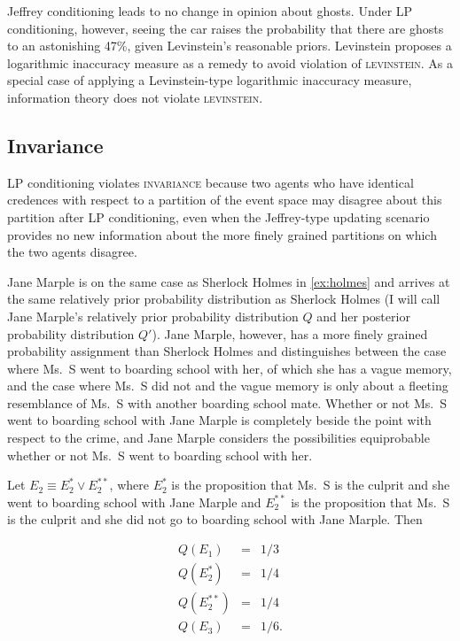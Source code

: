 \documentclass[smallextended]{svjour3}       %
\begin{document}
Jeffrey conditioning leads to no change in opinion about ghosts. Under
LP conditioning, however, seeing the car raises the probability that
there are ghosts to an astonishing 47\%, given Levinstein's reasonable
priors. Levinstein proposes a logarithmic inaccuracy measure as a
remedy to avoid violation of \textsc{levinstein}. As a special case of
applying a Levinstein-type logarithmic inaccuracy measure, information
theory does not violate \textsc{levinstein}.

\subsection{Invariance}
\label{Invariance}

LP conditioning violates \textsc{invariance} because two agents who
have identical credences with respect to a partition of the event
space may disagree about this partition after LP conditioning, even
when the Jeffrey-type updating scenario provides no new information
about the more finely grained partitions on which the two agents
disagree. 

\begin{quotex}
  \label{ex:marple} Jane Marple is on the same
  case as Sherlock Holmes in {\xample} \ref{ex:holmes} and arrives at
  the same relatively prior probability distribution as Sherlock
  Holmes (I will call Jane Marple's relatively prior probability
  distribution $Q$ and her posterior probability distribution $Q'$).
  Jane Marple, however, has a more finely grained probability
  assignment than Sherlock Holmes and distinguishes between the case
  where Ms.\ S went to boarding school with her, of which she has a
  vague memory, and the case where Ms.\ S did not and the vague memory
  is only about a fleeting resemblance of Ms.\ S with another boarding
  school mate. Whether or not Ms.\ S went to boarding school with Jane
  Marple is completely beside the point with respect to the crime, and
  Jane Marple considers the possibilities equiprobable whether or not
  Ms.\ S went to boarding school with her.
\end{quotex}

Let $E_{2}\equiv{}E_{2}^{*}\vee{}E_{2}^{**}$, where $E_{2}^{*}$ is the
proposition that Ms.\ S is the culprit and she went to boarding school
with Jane Marple and $E_{2}^{**}$ is the proposition that Ms.\ S is
the culprit and she did not go to boarding school with Jane Marple.
Then

\begin{equation}
  \label{eq:marpleprior}
  \begin{array}{rcl}
  Q(E_{1})&=&1/3\\
  Q(E_{2}^{*})&=&1/4\\
  Q(E_{2}^{**})&=&1/4\\
  Q(E_{3})&=&1/6.
\end{array}
\end{equation}
\end{document}

